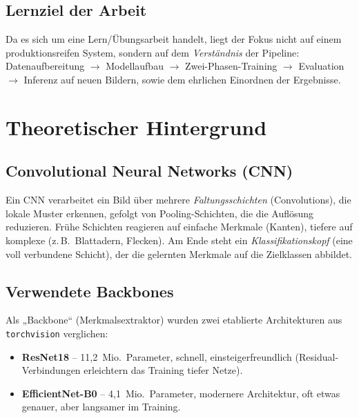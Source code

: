 \documentclass[11pt,a4paper]{article}
\begin{document}
\subsection{Lernziel der Arbeit}
Da es sich um eine Lern\-/Übungsarbeit handelt, liegt der Fokus nicht auf einem
produktionsreifen System, sondern auf dem \emph{Verständnis} der Pipeline:
Datenaufbereitung $\rightarrow$ Modellaufbau $\rightarrow$ Zwei-Phasen-Training
$\rightarrow$ Evaluation $\rightarrow$ Inferenz auf neuen Bildern, sowie dem
ehrlichen Einordnen der Ergebnisse.

\section{Theoretischer Hintergrund}

\subsection{Convolutional Neural Networks (CNN)}
Ein CNN verarbeitet ein Bild über mehrere \emph{Faltungsschichten}
(Convolutions), die lokale Muster erkennen, gefolgt von Pooling-Schichten, die
die Auflösung reduzieren. Frühe Schichten reagieren auf einfache Merkmale
(Kanten), tiefere auf komplexe (z.\,B.\ Blattadern, Flecken). Am Ende steht ein
\emph{Klassifikationskopf} (eine voll verbundene Schicht), der die gelernten
Merkmale auf die Zielklassen abbildet.

\subsection{Verwendete Backbones}
Als „Backbone“ (Merkmalsextraktor) wurden zwei etablierte Architekturen aus
\texttt{torchvision} verglichen:
\begin{itemize}[nosep]
  \item \textbf{ResNet18} -- 11{,}2~Mio.\ Parameter, schnell, einsteigerfreundlich
        (Residual-Verbindungen erleichtern das Training tiefer Netze).
  \item \textbf{EfficientNet-B0} -- 4{,}1~Mio.\ Parameter, modernere Architektur,
        oft etwas genauer, aber langsamer im Training.
\end{itemize}
\end{document}
